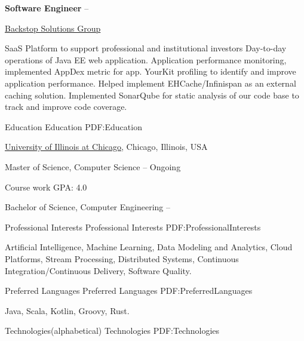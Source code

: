 \documentclass[letterpaper,MMMyyyy,nonstopmode]{simpleresumecv}
\begin{document}
\begin{Body}
\BigGap
\Entry
\textbf{Software Engineer}
\hfill
{} -- 

\href{https://www.backstopsolutions.com}{Backstop Solutions Group}

\BigGap
\BulletItem
SaaS Platform to support professional and institutional investors
\SubBulletItem Day-to-day operations of Java EE web application.
\SubBulletItem Application performance monitoring, implemented AppDex metric for app.
\SubBulletItem YourKit profiling to identify and improve application performance.
\SubBulletItem Helped implement EHCache/Infinispan as an external caching solution.
\SubBulletItem Implemented SonarQube for static analysis of our code base to track and improve code coverage.
\BigGap


\Section
{Education}
{Education}
{PDF:Education}

\Entry
\href{https://www.cs.uic.edu}
{University of Illinois at Chicago},
Chicago, Illinois, USA

\Gap
\BulletItem
Master of Science, Computer Science
\hfill
{} -- Ongoing

\SubBulletItem
Course work GPA: 4.0

\Gap
\BulletItem
Bachelor of Science, Computer Engineering
\hfill
{} --

\BigGap


\Section
{Professional Interests}
{Professional Interests}
{PDF:ProfessionalInterests}

\Entry
Artificial Intelligence,
Machine Learning,
Data Modeling and Analytics,
Cloud Platforms,
Stream Processing,
Distributed Systems,
Continuous Integration/Continuous Delivery,
Software Quality.

\BigGap


\Section
{Preferred Languages}
{Preferred Languages}
{PDF:PreferredLanguages}

\Entry
Java,
Scala,
Kotlin,
Groovy,
Rust.

\BigGap


\Section
{Technologies\newline (alphabetical)}
{Technologies}
{PDF:Technologies}


\end{Body}
\end{document}
